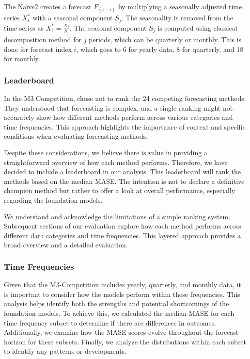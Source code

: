 \documentclass[12pt,a4paper]{article}
\begin{document}
The Naïve2 creates a forecast $F_{\left(t+i\right)}$ by multiplying a seasonally adjusted time series $X_t^\ast$ with a seasonal component $S_j$. The seasonality is removed from the time series as $X_t^\ast = \frac{X_t}{S_j}$. The seasonal component $S_j$ is computed using classical decomposition method for $j$ periods, which can be quarterly or monthly. This is done for forecast index $i$, which goes to 6 for yearly data, 8 for quarterly, and 18 for monthly. 

\subsubsection{Leaderboard}

In the M3 Competition, \cite{MAKRIDAKIS2000} chose not to rank the 24 competing forecasting methods. They understood that forecasting is complex, and a single ranking might not accurately show how different methods perform across various categories and time frequencies. This approach highlights the importance of context and specific conditions when evaluating forecasting methods.

Despite these considerations, we believe there is value in providing a straightforward overview of how each method performs. Therefore, we have decided to include a leaderboard in our analysis. This leaderboard will rank the methods based on the median MASE. The intention is not to declare a definitive champion method but rather to offer a look at overall performance, especially regarding the foundation models.

We understand and acknowledge the limitations of a simple ranking system. Subsequent sections of our evaluation explore how each method performs across different data categories and time frequencies. This layered approach provides a broad overview and a detailed evaluation.


\subsubsection{Time Frequencies}

Given that the M3-Competition includes yearly, quarterly, and monthly data, it is important to consider how the models perform within these frequencies. This analysis helps identify both the strengths and potential shortcomings of the foundation models. To achieve this, we calculated the median MASE for each time frequency subset to determine if there are differences in outcomes. Additionally, we examine how the MASE scores evolve throughout the forecast horizon for these subsets. Finally, we analyze the distributions within each subset to identify any patterns or developments.
\end{document}
